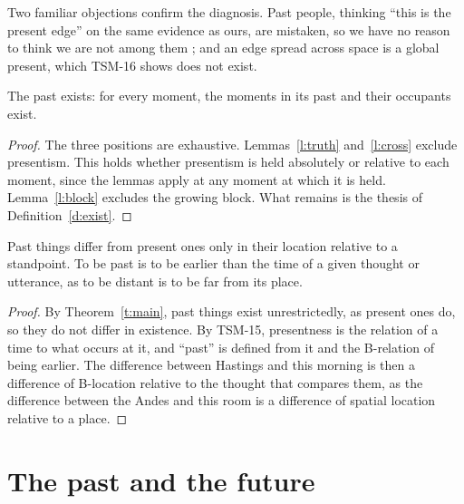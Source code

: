 \documentclass{situationist-preprint}
\begin{document}
Two familiar objections confirm the diagnosis. Past people, thinking \enquote{this is the present edge} on the same evidence as ours, are mistaken, so we have no reason to think we are not among them \citep{Bourne2002,BraddonMitchell2004}; and an edge spread across space is a global present, which TSM-16 shows does not exist.

\begin{theorem}\label{t:main}
The past exists: for every moment, the moments in its past and their occupants exist.
\end{theorem}

\begin{proof}
The three positions are exhaustive. Lemmas~\ref{l:truth} and~\ref{l:cross} exclude presentism. This holds whether presentism is held absolutely or relative to each moment, since the lemmas apply at any moment at which it is held. Lemma~\ref{l:block} excludes the growing block. What remains is the thesis of Definition~\ref{d:exist}.
\end{proof}

\begin{corollary}[Elsewhere]\label{c:elsewhere}
Past things differ from present ones only in their location relative to a standpoint. To be past is to be earlier than the time of a given thought or utterance, as to be distant is to be far from its place.
\end{corollary}

\begin{proof}
By Theorem~\ref{t:main}, past things exist unrestrictedly, as present ones do, so they do not differ in existence. By TSM-15, presentness is the relation of a time to what occurs at it, and \enquote{past} is defined from it and the B-relation of being earlier. The difference between Hastings and this morning is then a difference of B-location relative to the thought that compares them, as the difference between the Andes and this room is a difference of spatial location relative to a place.
\end{proof}

\section{The past and the future}
\end{document}
